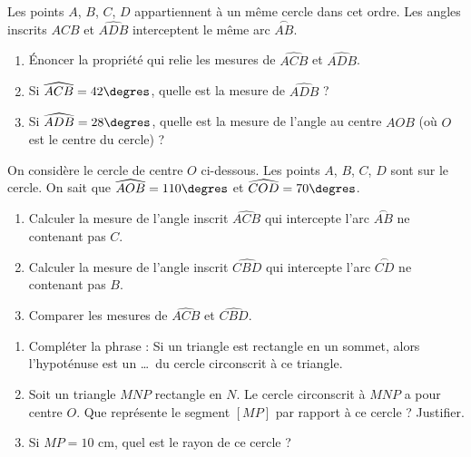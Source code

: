 \documentclass[11pt]{article}
\begin{document}
\begin{exercice}
Les points $A$, $B$, $C$, $D$ appartiennent à un même cercle dans cet ordre. Les angles inscrits $\widehat{ACB}$ et $\widehat{ADB}$ interceptent le même arc $\stackrel{\frown}{AB}$.
\begin{enumerate}
    \item Énoncer la propriété qui relie les mesures de $\widehat{ACB}$ et $\widehat{ADB}$.
    \item Si $\widehat{ACB} = 42\degres$, quelle est la mesure de $\widehat{ADB}$ ?
    \item Si $\widehat{ADB} = 28\degres$, quelle est la mesure de l'angle au centre $\widehat{AOB}$ (où $O$ est le centre du cercle) ?
\end{enumerate}
\end{exercice}

\begin{exercice}
On considère le cercle de centre $O$ ci-dessous. Les points $A$, $B$, $C$, $D$ sont sur le cercle. On sait que $\widehat{AOB} = 110\degres$ et $\widehat{COD} = 70\degres$.
\begin{center}
\end{center}
\begin{enumerate}
    \item Calculer la mesure de l'angle inscrit $\widehat{ACB}$ qui intercepte l'arc $\stackrel{\frown}{AB}$ ne contenant pas $C$.
    \item Calculer la mesure de l'angle inscrit $\widehat{CBD}$ qui intercepte l'arc $\stackrel{\frown}{CD}$ ne contenant pas $B$.
    \item Comparer les mesures de $\widehat{ACB}$ et $\widehat{CBD}$.
\end{enumerate}
\end{exercice}

\begin{exercice}
\begin{enumerate}
    \item Compléter la phrase : \og Si un triangle est rectangle en un sommet, alors l'hypoténuse est un \ldots\ du cercle circonscrit à ce triangle.\fg
    \item Soit un triangle $MNP$ rectangle en $N$. Le cercle circonscrit à $MNP$ a pour centre $O$. Que représente le segment $[MP]$ par rapport à ce cercle ? Justifier.
    \item Si $MP = 10$ cm, quel est le rayon de ce cercle ?
\end{enumerate}
\end{exercice}
\end{document}
